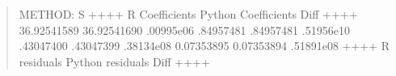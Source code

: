 \documentclass[letterpaper,10pt,english]{sphinxmanual}
\begin{document}
\begin{enumerate}
\begin{quote}
%
\begin{sphinxVerbatim}[commandchars=\\\{\}]
METHOD: S
+\PYGZhy{}\PYGZhy{}\PYGZhy{}\PYGZhy{}\PYGZhy{}\PYGZhy{}\PYGZhy{}\PYGZhy{}\PYGZhy{}\PYGZhy{}\PYGZhy{}\PYGZhy{}\PYGZhy{}\PYGZhy{}\PYGZhy{}\PYGZhy{}+\PYGZhy{}\PYGZhy{}\PYGZhy{}\PYGZhy{}\PYGZhy{}\PYGZhy{}\PYGZhy{}\PYGZhy{}\PYGZhy{}\PYGZhy{}\PYGZhy{}\PYGZhy{}\PYGZhy{}\PYGZhy{}\PYGZhy{}\PYGZhy{}\PYGZhy{}\PYGZhy{}\PYGZhy{}\PYGZhy{}\PYGZhy{}+\PYGZhy{}\PYGZhy{}\PYGZhy{}\PYGZhy{}\PYGZhy{}\PYGZhy{}\PYGZhy{}\PYGZhy{}\PYGZhy{}\PYGZhy{}\PYGZhy{}\PYGZhy{}\PYGZhy{}+
 R Coefficients  Python Coefficients     Diff     
+\PYGZhy{}\PYGZhy{}\PYGZhy{}\PYGZhy{}\PYGZhy{}\PYGZhy{}\PYGZhy{}\PYGZhy{}\PYGZhy{}\PYGZhy{}\PYGZhy{}\PYGZhy{}\PYGZhy{}\PYGZhy{}\PYGZhy{}\PYGZhy{}+\PYGZhy{}\PYGZhy{}\PYGZhy{}\PYGZhy{}\PYGZhy{}\PYGZhy{}\PYGZhy{}\PYGZhy{}\PYGZhy{}\PYGZhy{}\PYGZhy{}\PYGZhy{}\PYGZhy{}\PYGZhy{}\PYGZhy{}\PYGZhy{}\PYGZhy{}\PYGZhy{}\PYGZhy{}\PYGZhy{}\PYGZhy{}+\PYGZhy{}\PYGZhy{}\PYGZhy{}\PYGZhy{}\PYGZhy{}\PYGZhy{}\PYGZhy{}\PYGZhy{}\PYGZhy{}\PYGZhy{}\PYGZhy{}\PYGZhy{}\PYGZhy{}+
   \PYGZhy{}36.92541589         \PYGZhy{}36.92541690  .00995e\PYGZhy{}06 
     .84957481           .84957481  .51956e\PYGZhy{}10 
     .43047400           .43047399  .38134e\PYGZhy{}08 
    \PYGZhy{}0.07353895          \PYGZhy{}0.07353894  .51891e\PYGZhy{}08 
+\PYGZhy{}\PYGZhy{}\PYGZhy{}\PYGZhy{}\PYGZhy{}\PYGZhy{}\PYGZhy{}\PYGZhy{}\PYGZhy{}\PYGZhy{}\PYGZhy{}\PYGZhy{}\PYGZhy{}\PYGZhy{}\PYGZhy{}\PYGZhy{}+\PYGZhy{}\PYGZhy{}\PYGZhy{}\PYGZhy{}\PYGZhy{}\PYGZhy{}\PYGZhy{}\PYGZhy{}\PYGZhy{}\PYGZhy{}\PYGZhy{}\PYGZhy{}\PYGZhy{}\PYGZhy{}\PYGZhy{}\PYGZhy{}\PYGZhy{}\PYGZhy{}\PYGZhy{}\PYGZhy{}\PYGZhy{}+\PYGZhy{}\PYGZhy{}\PYGZhy{}\PYGZhy{}\PYGZhy{}\PYGZhy{}\PYGZhy{}\PYGZhy{}\PYGZhy{}\PYGZhy{}\PYGZhy{}\PYGZhy{}\PYGZhy{}+
  R residuals     Python residuals       Diff     
+\PYGZhy{}\PYGZhy{}\PYGZhy{}\PYGZhy{}\PYGZhy{}\PYGZhy{}\PYGZhy{}\PYGZhy{}\PYGZhy{}\PYGZhy{}\PYGZhy{}\PYGZhy{}\PYGZhy{}\PYGZhy{}\PYGZhy{}\PYGZhy{}+\PYGZhy{}\PYGZhy{}\PYGZhy{}\PYGZhy{}\PYGZhy{}\PYGZhy{}\PYGZhy{}\PYGZhy{}\PYGZhy{}\PYGZhy{}\PYGZhy{}\PYGZhy{}\PYGZhy{}\PYGZhy{}\PYGZhy{}\PYGZhy{}\PYGZhy{}\PYGZhy{}\PYGZhy{}\PYGZhy{}\PYGZhy{}+\PYGZhy{}\PYGZhy{}\PYGZhy{}\PYGZhy{}\PYGZhy{}\PYGZhy{}\PYGZhy{}\PYGZhy{}\PYGZhy{}\PYGZhy{}\PYGZhy{}\PYGZhy{}\PYGZhy{}+

\end{sphinxVerbatim}
\end{quote}
\end{enumerate}
\end{document}
